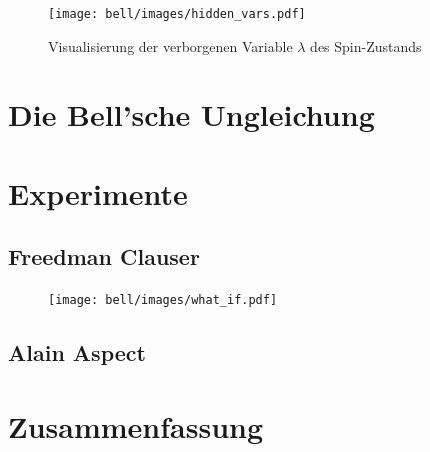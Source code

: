 \begin{refsection}
\begin{figure}
    \centering
    \texttt{[image: bell/images/hidden\_vars.pdf]}
    \caption{Visualisierung der verborgenen Variable $\lambda$ des Spin-Zustands}
    \label{fig:Bell:hidden_var}
\end{figure}


\section{Die Bell'sche Ungleichung}


\section{Experimente}
\subsection{Freedman Clauser}
    
    \begin{figure}[ht!]
        \centering
        \texttt{[image: bell/images/what\_if.pdf]}
    \end{figure}
    
\subsection{Alain Aspect}

\section{Zusammenfassung}


\printbibliography[heading=subbibliography]
\end{refsection}

